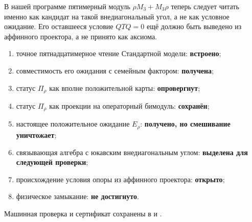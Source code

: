 В нашей программе пятимерный модуль
$\rho M_3+M_3\rho$ теперь следует читать именно как кандидат на такой
внедиагональный угол, а не как условное ожидание. Его оставшееся условие
$QTQ=0$ ещё должно быть выведено из аффинного проектора, а не принято как
аксиома.

\begin{protocol}
\begin{enumerate}
 \item точное пятнадцатимерное чтение Стандартной модели:
 \textbf{встроено};
 \item совместимость его ожидания с семейным фактором:
 \textbf{получена};
 \item статус $\Pi_\rho$ как вполне положительной карты:
 \textbf{опровергнут};
 \item статус $\Pi_\rho$ как проекции на операторный бимодуль:
 \textbf{сохранён};
 \item настоящее положительное ожидание $E_\rho$:
 \textbf{получено, но смешивание уничтожает};
 \item связывающая алгебра с юкавским внедиагональным углом:
 \textbf{выделена для следующей проверки};
 \item происхождение условия опоры из аффинного проектора:
 \textbf{открыто};
 \item физическое замыкание:
 \textbf{не достигнуто}.
\end{enumerate}
\end{protocol}

Машинная проверка и сертификат сохранены в
 и
.